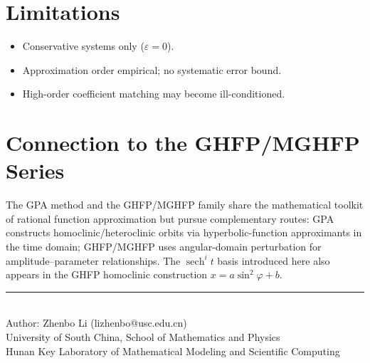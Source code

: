 \documentclass[11pt,a4paper]{article}
\begin{document}
\section{Limitations}
\begin{itemize}[leftmargin=2em]
\item Conservative systems only ($\varepsilon=0$).
\item Approximation order empirical; no systematic error bound.
\item High-order coefficient matching may become ill-conditioned.
\end{itemize}

\section{Connection to the GHFP/MGHFP Series}

The GPA method and the GHFP/MGHFP family share the mathematical toolkit of rational function approximation but pursue complementary routes: GPA constructs homoclinic/heteroclinic orbits via hyperbolic-function approximants in the time domain; GHFP/MGHFP uses angular-domain perturbation for amplitude--parameter relationships. The $\operatorname{sech}^i t$ basis introduced here also appears in the GHFP homoclinic construction $x = a\sin^2\varphi + b$.

\vfill
\begin{center}
\small\rule{0.5\textwidth}{0.3pt}\\[4pt]
\small\color{primary} Author: Zhenbo Li (lizhenbo@usc.edu.cn)\\
\small University of South China, School of Mathematics and Physics\\
\small Hunan Key Laboratory of Mathematical Modeling and Scientific Computing
\end{center}
\end{document}
